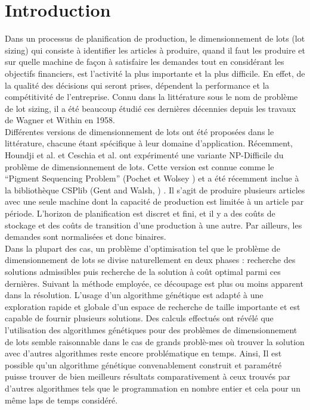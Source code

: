 \documentclass[12pt,a4paper]{article}
\begin{document}
	  
	
	\newpage
	
	\part*{Introduction}
	
	Dans un processus de planification de production, le dimensionnement
de lots (lot sizing) qui consiste à identifier les articles à produire, quand il
faut les produire et sur quelle machine de façon à satisfaire les demandes
tout en considérant les objectifs financiers, est l’activité la plus importante
et la plus difficile. En effet, de la qualité des décisions qui seront prises,
dépendent la performance et la compétitivité de l’entreprise. Connu dans la
littérature sous le nom de problème de lot sizing, il a été beaucoup étudié
ces dernières décennies depuis les travaux de Wagner et Within en 1958. \\
	\hspace*{.5cm} Différentes versions de dimensionnement de lots ont été proposées dans le littérature, chacune étant spécifique à leur domaine d'application. Récemment, Houndji et al. \cite{hvr_stockingCost} et Ceschia et al. \cite{opthub} ont expérimenté une variante NP-Difficile du problème de dimensionnement de lots. Cette version est connue comme le “Pigment Sequencing Problem” (Pochet et Wolsey \cite{pochet_wolsey}) et a été récemment inclue à la bibliothèque CSPlib (Gent and Walsh, \cite{gent_walsh}) . Il s'agit de produire plusieurs articles avec une seule machine dont la capacité de production est limitée à un article par période. L'horizon de planification est discret et fini, et il y a des coûts de stockage et des coûts de transition d'une production à une autre. Par ailleurs, les demandes sont normalisées et donc binaires. \\
	\hspace*{.5cm} Dans la plupart des cas, un problème d’optimisation tel que le problème de dimensionnement de lots se divise naturellement en deux phases : recherche des solutions admissibles puis recherche de la solution à coût optimal parmi ces dernières. Suivant la méthode employée, ce découpage est plus ou moins apparent dans la résolution. L’usage d’un algorithme génétique est adapté à une exploration rapide et globale d’un espace de recherche de taille importante et est capable de fournir plusieurs solutions. Des calculs effectués ont révélé que l'utilisation des algorithmes génétiques pour des problèmes de dimensionnement de lots semble raisonnable dans le cas de grands problè-mes où trouver la solution avec d'autres algorithmes reste encore problématique en temps. Ainsi, Il est possible qu'un algorithme génétique convenablement construit et paramétré puisse trouver de bien meilleurs résultats comparativement à ceux trouvés par d'autres algorithmes tels que le programmation en nombre entier et cela pour un même laps de temps considéré.
	
\end{document}
